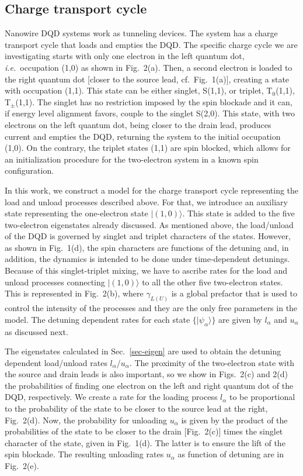 \documentclass[prb,twocolumn,showpacs,floats]{revtex4}
\begin{document}
\subsection{Charge transport cycle}

Nanowire DQD systems work as tunneling devices. The system has a charge transport cycle
that loads and empties the DQD. The specific charge cycle we are investigating
starts with only one electron in the left quantum dot, \textit{i.e.}~occupation (1,0)
as shown in Fig.~2(a). Then, 
a second electron is loaded to the right quantum dot [closer to the source lead, cf.~Fig.~1(a)],
creating a state with occupation (1,1). This state can be either singlet, S(1,1), or triplet, T$_0$(1,1),
T$_\pm$(1,1). The singlet has no restriction imposed by the spin blockade and
it can, if energy level alignment favors, couple to the singlet S(2,0). This state,
with two electrons on the left quantum dot, being closer to the drain lead,
produces current and empties the DQD, returning the system to the initial occupation (1,0).
On the contrary, the triplet states (1,1) are spin blocked, which allows for
an initialization procedure for the two-electron system in a
known spin configuration.

In this work, we construct a model for the charge transport cycle representing the load and unload processes
described above. For that, we introduce an auxiliary state 
representing the one-electron state $| (1,0) \rangle $.\cite{petta-prb}
This state is added to the five two-electron eigenstates already discussed. 
As mentioned above, the load/unload of the DQD is governed by singlet and triplet characters
of the states. However, as shown in Fig.~1(d), the spin characters are functions of the
detuning and, in addition, the dynamics is intended to be done under time-dependent detunings.
Because of this singlet-triplet mixing, we have to ascribe rates for the load and unload processes 
connecting $| (1,0) \rangle $ to all the other five two-electron states. This is represented
in Fig.~2(b), where $\gamma_{L(U)}$ is a global prefactor that is used to control the
intensity of the processes and they are the only free parameters in the model. The
detuning dependent rates for each state $\{ | \psi_\alpha \rangle \}$ are given
by $l_\alpha$ and $u_\alpha$ as discussed next.

The eigenstates calculated in Sec.~\ref{sec-eigen} are used to obtain the detuning
dependent load/unload rates $l_\alpha$/$u_\alpha$. 
The proximity of the two-electron state with the source and drain leads
is also important, so we show in Figs.~2(c) and 2(d) the probabilities of finding one electron on
the left and right quantum dot of the DQD, respectively.
We create a rate for the loading process $l_\alpha$ to be proportional to the 
probability of the state to be closer to the source lead at the right, Fig.~2(d). 
Now, the probability for unloading $u_\alpha$ is given by the product of the probabilities of the state to be closer
to the drain [Fig.~2(c)] times the singlet character of the state, given in Fig.~1(d). The latter
is to ensure the lift of the spin blockade. The resulting unloading rates $u_\alpha$ 
as function of detuning are in Fig.~2(e).
\end{document}
